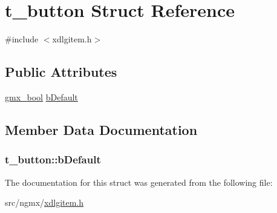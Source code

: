 \hypertarget{structt__button}{\section{t\-\_\-button \-Struct \-Reference}
\label{structt__button}
}


{\ttfamily \#include $<$xdlgitem.\-h$>$}

\subsection*{\-Public \-Attributes}
\begin{DoxyCompactItemize}
\item 
\hyperlink{include_2types_2simple_8h_a8fddad319f226e856400d190198d5151}{gmx\-\_\-bool} \hyperlink{structt__button_aef7de9b8212fe04c810ac2a02227af22}{b\-Default}
\end{DoxyCompactItemize}


\subsection{\-Member \-Data \-Documentation}
\hypertarget{structt__button_aef7de9b8212fe04c810ac2a02227af22}{
\subsubsection[{b\-Default}]{ {\bf t\-\_\-button\-::b\-Default}}}\label{structt__button_aef7de9b8212fe04c810ac2a02227af22}


\-The documentation for this struct was generated from the following file\-:\begin{DoxyCompactItemize}
\item 
src/ngmx/\hyperlink{xdlgitem_8h}{xdlgitem.\-h}\end{DoxyCompactItemize}
